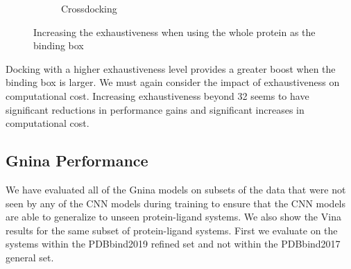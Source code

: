 \documentclass[journal=jcisd8,manuscript=article]{achemso}
\begin{document}
\begin{figure}
\begin{subfigure}[b]{0.48\textwidth}
    		\caption{Crossdocking}
    		\label{fig:WholeProteinCD}
        \end{subfigure}    
	\caption{Increasing the exhaustiveness when using the whole protein as the binding box}
	\label{fig:WholeProtein}
\end{figure}
Docking with a higher exhaustiveness level provides a greater boost when the binding box is larger. We must again consider the impact of exhaustiveness on computational cost. Increasing exhaustiveness beyond 32 seems to have significant reductions in performance gains and significant increases in computational cost. 

\subsection{Gnina Performance}
We have evaluated all of the Gnina models on subsets of the data that were not seen by any of the CNN models during training to ensure that the CNN models are able to generalize to unseen protein-ligand systems. We also show the Vina results for the same subset of protein-ligand systems. First we evaluate on the systems within the PDBbind2019 refined set and not within the PDBbind2017 general set.
\end{document}
